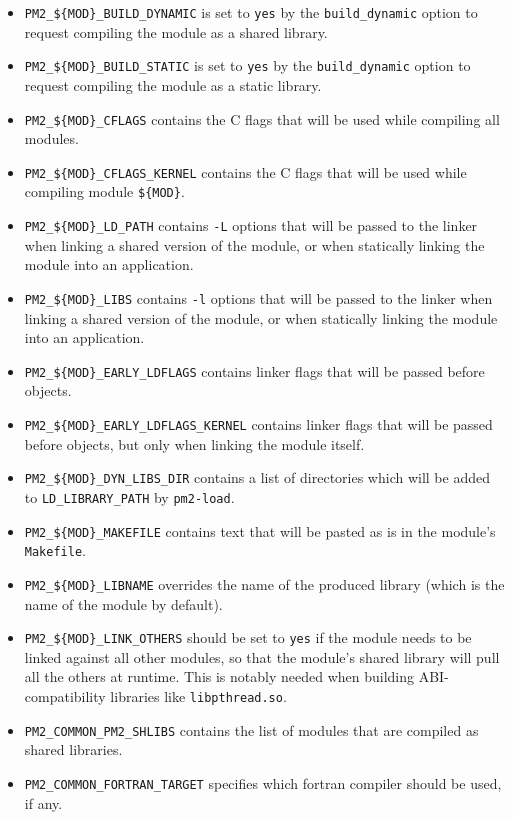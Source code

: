 \documentclass[11pt, a4paper ,twoside]{article}
\begin{document}
\begin{itemize}
\item \verb+PM2_${MOD}_BUILD_DYNAMIC+ is set to \verb+yes+ by the
\verb+build_dynamic+ option to request compiling the module as a shared
library.
\item \verb+PM2_${MOD}_BUILD_STATIC+ is set to \verb+yes+ by the
\verb+build_dynamic+ option to request compiling the module as a static
library.
\item \verb+PM2_${MOD}_CFLAGS+ contains the C flags that will be used
while compiling all modules.
\item \verb+PM2_${MOD}_CFLAGS_KERNEL+ contains the C flags that will be
used while compiling module \verb+${MOD}+.
\item \verb+PM2_${MOD}_LD_PATH+ contains \verb+-L+ options that will be
passed to the linker when linking a shared version of the module, or
when statically linking the module into an application.
\item \verb+PM2_${MOD}_LIBS+ contains \verb+-l+ options that will be
passed to the linker when linking a shared version of the module, or
when statically linking the module into an application.
\item \verb+PM2_${MOD}_EARLY_LDFLAGS+ contains linker flags that will be
passed before objects.
\item \verb+PM2_${MOD}_EARLY_LDFLAGS_KERNEL+ contains linker flags that
will be passed before objects, but only when linking the module itself.
\item \verb+PM2_${MOD}_DYN_LIBS_DIR+ contains a list of directories
which will be added to \verb+LD_LIBRARY_PATH+ by \verb+pm2-load+.
\item \verb+PM2_${MOD}_MAKEFILE+ contains text that will be pasted as is
in the module's \verb+Makefile+.
\item \verb+PM2_${MOD}_LIBNAME+ overrides the name of the produced
library (which is the name of the module by default).
\item \verb+PM2_${MOD}_LINK_OTHERS+ should be set to \verb+yes+ if the
module needs to be linked against all other modules, so that the
module's shared library will pull all the others at runtime.  This is
notably needed when building ABI-compatibility libraries like
\verb+libpthread.so+.
\item \verb+PM2_COMMON_PM2_SHLIBS+ contains the list of modules that are
compiled as shared libraries.
\item \verb+PM2_COMMON_FORTRAN_TARGET+ specifies which fortran compiler
should be used, if any.

\end{itemize}
\end{document}
